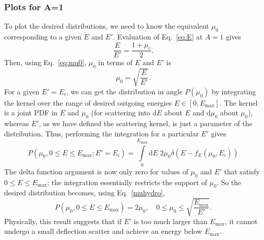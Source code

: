 \documentclass[12pt]{article}
\renewcommand{\d}{\mathrm{d}}
\newenvironment{solution}[1][Solution]{\begin{trivlist}
\item[\hskip \labelsep {\bfseries #1} {\hspace{-0.2em}\bfseries:}]\hspace{0.3in}\newline}{\end{trivlist}}
\begin{document}
\begin{solution}
\subsubsection*{Plots for A=1}

To plot the desired distributions, we need to know the equivalent $\mu_0$
corresponding to a given $E$ and $E'$.  Evaluation of Eq.~\eqref{eq:E} at $A=1$ gives
\begin{equation}
    \frac{E}{E'} = \frac{1+\mu_c}{2}.
\end{equation}
Then, using Eq.~\eqref{eq:mu0}, $\mu_0$ in terms of $E$ and $E'$ is 
\begin{equation}\label{muhydro}
    \mu_0 = \sqrt{\frac{E}{E'}}.
\end{equation}
For a given $E'=E_i$, we can get the distribution in angle $P(\mu_0)$ by integrating the
kernel over the range of desired outgoing energies $E\in[0,E_{\max}]$. The
kernel is a joint PDF in $E$ and $\mu_0$ (for scattering into $\d E$ about $E$ and $\d
\mu_0$ about $\mu_0$), whereas $E'$, as we have defined the scattering kernel, is just a parameter of the distribution.
Thus, performing the integration for a particular $E'$ gives
\begin{equation}
    P(\mu_0,0\leq E\leq E_{\max};E'=E_i) = \int\limits_0^{E_{\max}}\!\d E \;2\mu_0
    \delta(E-f_E(\mu_0,E_i))
\end{equation}
The delta function argument is now only zero for values of $\mu_0$ and $E'$ that
satisfy $0\leq E \leq E_{\max}$; the integration essentially restricts the support of
$\mu_0$.  So the desired distribution becomes, using Eq.~\eqref{muhydro},
\begin{equation} 
    P(\mu_0,0\leq E\leq E_{\max}) = 2\mu_0,\quad 0\leq \mu_0 \leq
    \sqrt{\frac{E_{\max}}{E'}}.
\end{equation}
Physically, this result suggests that if $E'$ is too much larger than $E_{\max}$, it
cannot undergo a small deflection scatter and achieve an energy below $E_{\max}$.


\end{solution}
\end{document}
